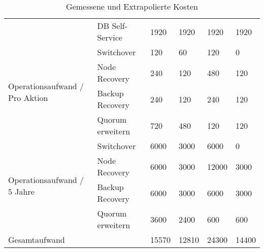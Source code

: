 \begin{table}[H]
{\begin{tabular}{@{}llllll@{}}
                                                & DB Self-Service                        & 1920              & 1920                         & 1920              & 1920       \\
\multirow{4}{*}{Operationsaufwand / Pro Aktion} & Switchover                             & 120               & 60                           & 120               & 0          \\
                                                & Node Recovery                          & 240               & 120                          & 480               & 120        \\
                                                & Backup Recovery                        & 240               & 120                          & 240               & 120        \\
                                                & Quorum erweitern                       & 720               & 480                          & 120               & 120        \\
\multirow{4}{*}{Operationsaufwand / 5 Jahre}    & Switchover                             & 6000              & 3000                         & 6000              & 0          \\
                                                & Node Recovery                          & 6000              & 3000                         & 12000             & 3000       \\
                                                & Backup Recovery                        & 6000              & 3000                         & 6000              & 3000       \\
                                                & Quorum erweitern                       & 3600              & 2400                         & 600               & 600        \\ \midrule
\multicolumn{2}{l}{Gesamtaufwand}                                                        & 15570             & 12810                        & 24300             & 14400      \\ \bottomrule
\end{tabular}%
}
\caption{Gemessene und Extrapolierte Kosten}
\label{tab:cost_investment}
\end{table}